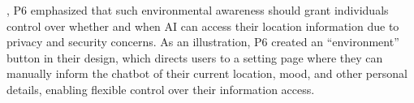 , P6 emphasized that such environmental awareness should grant individuals control over whether and when AI can access their location information due to privacy and security concerns. 
As an illustration, P6 created an ``environment'' button in their design, which directs users to a setting page where they can manually inform the chatbot of their current location, mood, and other personal details, enabling flexible control over their information access.




